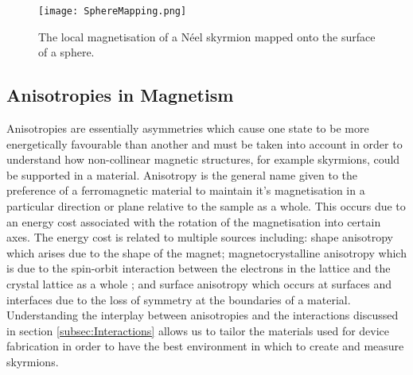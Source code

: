     \begin{figure}[htbp]
	    \centering
	    \texttt{[image: SphereMapping.png]}
	    \caption{The local magnetisation of a N\'{e}el skyrmion mapped onto the surface of a sphere.\cite{Everschor-Sitte2014}}
	    \label{fig:spheremappings}
    \end{figure}

    \subsection{Anisotropies in Magnetism}\label{subsec:Anisotropies}
    Anisotropies are essentially asymmetries which cause one state to be more energetically favourable than another and must be taken into account in order to understand how non-collinear magnetic structures, for example skyrmions, could be supported in a material. Anisotropy is the general name given to the preference of a ferromagnetic material to maintain it's magnetisation in a particular direction or plane relative to the sample as a whole. This occurs due to an energy cost associated with the rotation of the magnetisation into certain axes. The energy cost is related to multiple sources including: shape anisotropy which arises due to the shape of the magnet; magnetocrystalline anisotropy which is due to the spin-orbit interaction between the electrons  in the lattice and the crystal lattice as a whole \cite{Kittel2005}; and surface anisotropy which occurs at surfaces and interfaces due to the loss of symmetry at the boundaries of a material. Understanding the interplay between anisotropies and the interactions discussed in section \ref{subsec:Interactions} allows us to tailor the materials used for device fabrication in order to have the best environment in which to create and measure skyrmions.

